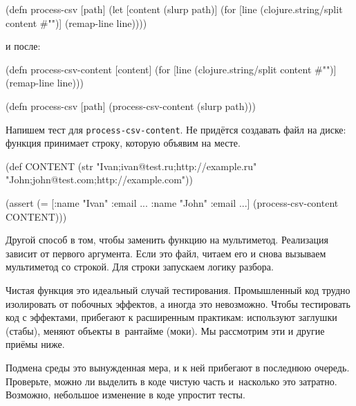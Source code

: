 
\begin{english}
  \begin{clojure}
(defn process-csv [path]
  (let [content (slurp path)]
    (for [line (clojure.string/split content #"\n")]
      (remap-line line))))
  \end{clojure}
\end{english}

\noindent
и после:

\begin{english}
  \begin{clojure}
(defn process-csv-content [content]
  (for [line (clojure.string/split content #"\n")]
    (remap-line line)))

(defn process-csv [path]
  (process-csv-content (slurp path)))
  \end{clojure}
\end{english}

Напишем тест для \verb|process-csv-content|. Не придётся создавать файл на
диске: функция принимает строку, которую объявим на месте.

\begin{english}
  \begin{clojure}
(def CONTENT
  (str "Ivan;ivan@test.ru;http://example.ru"
       \newline
       "John;john@test.com;http://example.com"))

(assert (= [{:name "Ivan" :email ...}
            {:name "John" :email ...}]
           (process-csv-content CONTENT)))
  \end{clojure}
\end{english}

Другой способ в том, чтобы заменить функцию на мультиметод. Реализация зависит
от первого аргумента. Если это файл, читаем его и снова вызываем мультиметод со
строкой. Для строки запускаем логику разбора.

Чистая функция это идеальный случай тестирования. Промышленный код трудно
изолировать от побочных эффектов, а иногда это невозможно. Чтобы тестировать код
с эффектами, прибегают к расширенным практикам: используют заглушки (стабы),
меняют объекты в~рантайме (моки). Мы рассмотрим эти и другие приёмы ниже.

Подмена среды это вынужденная мера, и к ней прибегают в последнюю
очередь. Проверьте, можно ли выделить в коде чистую часть и~насколько это
затратно. Возможно, небольшое изменение в коде упростит тесты.

